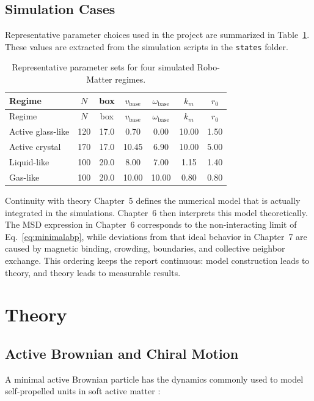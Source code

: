 \documentclass[12pt,a4paper,oneside]{report}
\begin{document}
\section{Simulation Cases}
Representative parameter choices used in the project are summarized in Table~\ref{tab:phaseparams}. These values are extracted from the simulation scripts in the \texttt{states} folder.

\begin{longtable}{>{\raggedright\arraybackslash}p{3.0cm}cccccc}
\caption{Representative parameter sets for four simulated Robo-Matter regimes.}
\label{tab:phaseparams}\\
\toprule
Regime & $N$ & box & $v_{\mathrm{base}}$ & $\omega_{\mathrm{base}}$ & $k_m$ & $r_0$ \\
\midrule
\endfirsthead
\toprule
Regime & $N$ & box & $v_{\mathrm{base}}$ & $\omega_{\mathrm{base}}$ & $k_m$ & $r_0$ \\
\midrule
\endhead
Active glass-like & 120 & 17.0 & 0.70 & 0.00 & 10.00 & 1.50 \\
Active crystal & 170 & 17.0 & 10.45 & 6.90 & 10.00 & 5.00 \\
Liquid-like & 100 & 20.0 & 8.00 & 7.00 & 1.15 & 1.40 \\
Gas-like & 100 & 20.0 & 10.00 & 10.00 & 0.80 & 0.80 \\
\bottomrule
\end{longtable}

\begin{notebox}{Continuity with theory}
Chapter~5 defines the numerical model that is actually integrated in the simulations. Chapter~6 then interprets this model theoretically. The MSD expression in Chapter~6 corresponds to the non-interacting limit of Eq.~\ref{eq:minimalabp}, while deviations from that ideal behavior in Chapter~7 are caused by magnetic binding, crowding, boundaries, and collective neighbor exchange. This ordering keeps the report continuous: model construction leads to theory, and theory leads to measurable results.
\end{notebox}

\chapter{Theory}

\section{Active Brownian and Chiral Motion}
A minimal active Brownian particle has the dynamics commonly used to model self-propelled units in soft active matter \cite{marchetti2013hydrodynamics,bechinger2016active}:
\end{document}
